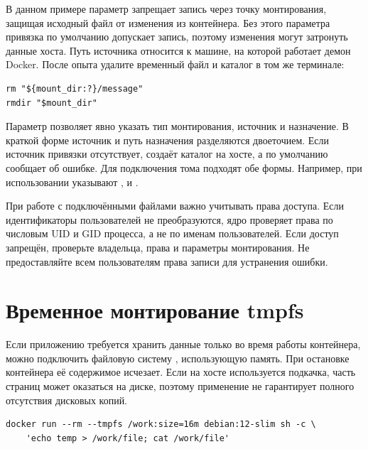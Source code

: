 В данном примере параметр  запрещает запись через точку монтирования, защищая исходный файл от изменения из контейнера. Без этого параметра привязка по умолчанию допускает запись, поэтому изменения могут затронуть данные хоста. Путь источника относится к машине, на которой работает демон Docker. После опыта удалите временный файл и каталог в том же терминале:
\par\addvspace{10pt}\noindent\begin{minipage}{\linewidth}
\begin{verbatim}
rm "${mount_dir:?}/message"
rmdir "$mount_dir"
\end{verbatim}
\end{minipage}\par\addvspace{10pt}

Параметр  позволяет явно указать тип монтирования, источник и назначение. В краткой форме  источник и путь назначения разделяются двоеточием. Если источник привязки отсутствует,  создаёт каталог на хосте, а  по умолчанию сообщает об ошибке. Для подключения тома подходят обе формы. Например, при использовании  указывают ,  и .

При работе с подключёнными файлами важно учитывать права доступа. Если идентификаторы пользователей не преобразуются, ядро проверяет права по числовым UID и GID процесса, а не по именам пользователей. Если доступ запрещён, проверьте владельца, права и параметры монтирования. Не предоставляйте всем пользователям права записи для устранения ошибки.

\section{Временное монтирование tmpfs}

Если приложению требуется хранить данные только во время работы контейнера, можно подключить файловую систему , использующую память. При остановке контейнера её содержимое исчезает. Если на хосте используется подкачка, часть страниц может оказаться на диске, поэтому применение  не гарантирует полного отсутствия дисковых копий.

\par\addvspace{10pt}\noindent\begin{minipage}{\linewidth}
\begin{verbatim}
docker run --rm --tmpfs /work:size=16m debian:12-slim sh -c \
    'echo temp > /work/file; cat /work/file'
\end{verbatim}
\end{minipage}\par\addvspace{10pt}

